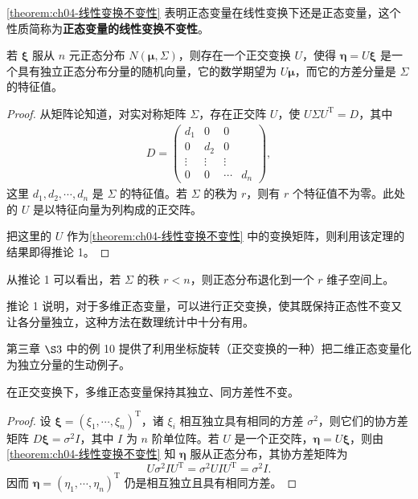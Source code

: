 \documentclass[../../main.tex]{subfiles}
\begin{document}
\cref{theorem:ch04-线性变换不变性} 表明正态变量在线性变换下还是正态变量，这个性质简称为\textbf{正态变量的线性变换不变性}。

\begin{corollary}[正交变换对角化]\label{corollary:ch04-正交对角化}
若 $\boldsymbol{\xi}$ 服从 $n$ 元正态分布 $N(\boldsymbol{\mu},\Sigma)$，则存在一个正交变换 $U$，使得 $\boldsymbol{\eta}=U\boldsymbol{\xi}$ 是一个具有独立正态分布分量的随机向量，它的数学期望为 $U\boldsymbol{\mu}$，而它的方差分量是 $\Sigma$ 的特征值。
\end{corollary}

\begin{proof}
从矩阵论知道，对实对称矩阵 $\Sigma$，存在正交阵 $U$，使 $U\Sigma U^{\mathrm{T}}=D$，其中
\begin{align}
D=\begin{pmatrix}
d_1&0&0\\
0&d_2&0\\
\vdots&\vdots&\vdots\\
0&0&\cdots&d_n
\end{pmatrix},\label{align:ch04-对角阵}
\end{align}
这里 $d_1,d_2,\cdots,d_n$ 是 $\Sigma$ 的特征值。若 $\Sigma$ 的秩为 $r$，则有 $r$ 个特征值不为零。此处的 $U$ 是以特征向量为列构成的正交阵。

把这里的 $U$ 作为\cref{theorem:ch04-线性变换不变性} 中的变换矩阵，则利用该定理的结果即得推论 1。
\end{proof}

从推论 1 可以看出，若 $\Sigma$ 的秩 $r<n$，则正态分布退化到一个 $r$ 维子空间上。

推论 1 说明，对于多维正态变量，可以进行正交变换，使其既保持正态性不变又让各分量独立，这种方法在数理统计中十分有用。

第三章 $\S 3$ 中的例 10 提供了利用坐标旋转（正交变换的一种）把二维正态变量化为独立分量的生动例子。

\begin{corollary}[正交变换保持同方差]\label{corollary:ch04-正交同方差}
在正交变换下，多维正态变量保持其独立、同方差性不变。
\end{corollary}

\begin{proof}
设 $\boldsymbol{\xi}=(\xi_1,\cdots,\xi_n)^{\mathrm{T}}$，诸 $\xi_i$ 相互独立具有相同的方差 $\sigma^2$，则它们的协方差矩阵 $D\boldsymbol{\xi}=\sigma^2 I$，其中 $I$ 为 $n$ 阶单位阵。若 $U$ 是一个正交阵，$\boldsymbol{\eta}=U\boldsymbol{\xi}$，则由\cref{theorem:ch04-线性变换不变性} 知 $\boldsymbol{\eta}$ 服从正态分布，其协方差矩阵为
\[
U\sigma^2 I U^{\mathrm{T}}=\sigma^2 U I U^{\mathrm{T}}=\sigma^2 I.
\]
因而 $\boldsymbol{\eta}=(\eta_1,\cdots,\eta_n)^{\mathrm{T}}$ 仍是相互独立且具有相同方差。
\end{proof}
\end{document}
